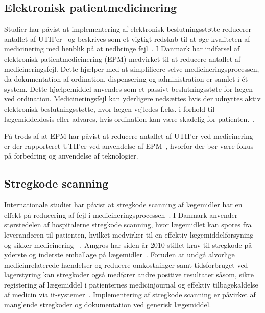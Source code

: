\subsection{Elektronisk patientmedicinering}
Studier har påvist at implementering af elektronisk beslutningsstøtte reducerer antallet af UTH'er~\citep{DW1998,Bates2013,Cheng2011,Raboel2005} og beskrives som et vigtigt redskab til at øge kvaliteten af medicinering med henblik på at nedbringe fejl~\citep{Raboel2005}. I Danmark har indførsel af elektronisk patientmedicinering (EPM) medvirket til at reducere antallet af medicineringsfejl. Dette hjælper med at simplificere selve medicineringsprocessen, da dokumentation af ordination, dispensering og administration er samlet i ét system. Dette hjælpemiddel anvendes som et passivt beslutningsstøte for lægen ved ordination.
Medicineringsfejl kan yderligere nedsættes hvis der udnyttes aktiv elektronisk beslutningsstøtte, hvor lægen vejledes f.eks. i forhold til lægemiddeldosis eller advares, hvis ordination kan være skadelig for patienten.~\citep{Raboel2005}. 

På trods af at EPM har påvist at reducere antallet af UTH'er ved medicinering er der rapporteret UTH'er ved anvendelse af EPM~\citep{Syddanmark2008}, hvorfor der bør være fokus på forbedring og anvendelse af teknologier. 


\subsection{Stregkode scanning}
Internationale studier har påvist at stregkode scanning af lægemidler har en effekt på reducering af fejl i medicineringsprocessen~\citep{Poon2006,Bates2000,Levtzion-korach2010}. I Danmark anvender størstedelen af hospitalerne stregkode scanning, hvor lægemidlet kan spores fra leverandøren til patienten, hvilket medvirker til en effektiv lægemiddelforsyning og sikker medicinering ~\citep{Dzik2007,DPSD2008,Amgros2013}. Amgros har siden år 2010 stillet krav til stregkode på yderste og inderste emballage på lægemidler~\citep{Amgros2013}. Foruden at undgå alvorlige medicinrelaterede hændelser og reducere omkostninger samt tidsforbruget ved lagerstyring kan stregkoder også medfører andre positive resultater såsom, sikre registering af lægemiddel i patienternes medicinjournal og effektiv tilbagekaldelse af medicin via it-systemer~\citep{Amgros2013}.
Implementering af stregkode scanning er påvirket af manglende stregkoder og dokumentation ved generisk lægemiddel. 

